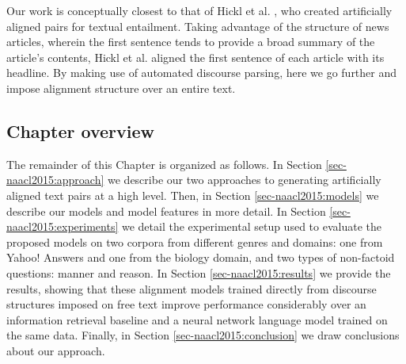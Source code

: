 Our work is conceptually closest to that of Hickl et al. \citeyear{hickl2006recognizing}, who created artificially aligned pairs for textual entailment.  Taking advantage of the structure of news articles, wherein the first sentence tends to provide a broad summary of the article's contents, Hickl et al. aligned the first sentence of each article with its headline.  By making use of automated discourse parsing, here we go further and impose alignment structure over an entire text.

\subsection{Chapter overview}

The remainder of this Chapter is organized as follows.  In Section \ref{sec-naacl2015:approach} we describe our two approaches to generating artificially aligned text pairs at a high level.  Then, in Section \ref{sec-naacl2015:models} we describe our models and model features in more detail.  In Section \ref{sec-naacl2015:experiments} we detail the experimental setup used to evaluate the proposed models on two corpora from different genres and domains: one from Yahoo! Answers and one from the biology domain, and two types of non-factoid questions: manner and reason. In Section \ref{sec-naacl2015:results} we provide the results, showing that these alignment models trained directly from discourse structures imposed on free text
improve performance considerably over an information retrieval baseline and a neural network language model trained on the same data.  Finally, in Section \ref{sec-naacl2015:conclusion} we draw conclusions about our approach.

%
%
%
%
%



